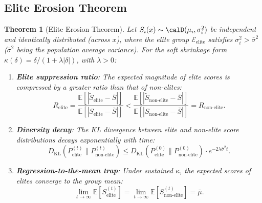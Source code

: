 \documentclass[12pt,a4paper]{article}
\newtheorem{theorem}{Theorem}[section]
\theoremstyle{definition}
\newcommand{\E}{\mathbb{E}}
\newcommand{\calE}{\mathcal{E}}
\newcommand{\DKL}{D_{\mathrm{KL}}}
\begin{document}
\subsection{Elite Erosion Theorem}

\begin{theorem}[Elite Erosion Theorem]
\label{thm:elite_erosion}
Let $S_i(x) \sim \calD(\mu_i, \sigma_i^2)$ be independent and identically distributed (across $x$), where the elite group $\calE_{\text{elite}}$ satisfies $\sigma_i^2 > \bar{\sigma}^2$ ($\bar{\sigma}^2$ being the population average variance). For the soft shrinkage form $\kappa(\delta) = \delta/(1+\lambda|\delta|)$, with $\lambda > 0$:

\begin{enumerate}[label=(\roman*)]
    \item \textbf{Elite suppression ratio}: The expected magnitude of elite scores is compressed by a greater ratio than that of non-elites:
    \begin{equation}
        R_{\text{elite}} = \frac{\E[|\tilde{S}_{\text{elite}} - \bar{S}|]}{\E[|S_{\text{elite}} - \bar{S}|]} < \frac{\E[|\tilde{S}_{\text{non-elite}} - \bar{S}|]}{\E[|S_{\text{non-elite}} - \bar{S}|]} = R_{\text{non-elite}}.
    \end{equation}

    \item \textbf{Diversity decay}: The KL divergence between elite and non-elite score distributions decays exponentially with time:
    \begin{equation}
        \DKL(P_{\text{elite}}^{(t)} \| P_{\text{non-elite}}^{(t)}) \leq \DKL(P_{\text{elite}}^{(0)} \| P_{\text{non-elite}}^{(0)}) \cdot e^{-2\lambda \bar{\sigma}^2 t}.
    \end{equation}

    \item \textbf{Regression-to-the-mean trap}: Under sustained $\kappa$, the expected scores of elites converge to the group mean:
    \begin{equation}
        \lim_{t \to \infty} \E[S_{\text{elite}}^{(t)}] = \lim_{t \to \infty} \E[S_{\text{non-elite}}^{(t)}] = \bar{\mu}.
    \end{equation}
\end{enumerate}
\end{theorem}
\end{document}
